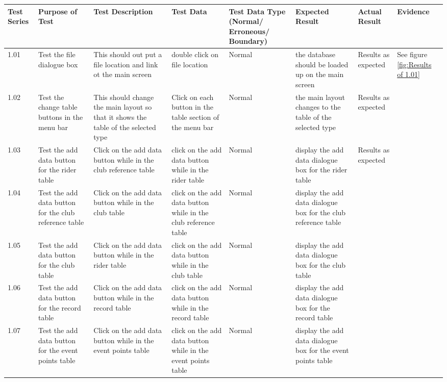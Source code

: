 \begin{landscape}
\begin{center}
    \begin{longtable}{|p{1.5cm}|p{2.5cm}|p{2.5cm}|p{2cm}|p{2cm}|p{2cm}|p{2cm}|p{2cm}|}
        \hline
        \textbf{Test Series} & \textbf{Purpose of Test} & \textbf{Test Description} & \textbf{Test Data} & \textbf{Test Data Type (Normal/ Erroneous/ Boundary)} & \textbf{Expected Result} & \textbf{Actual Result} & \textbf{Evidence}\\ \hline
        1.01 & Test the file dialogue box & This should out put a file location and link ot the main screen & double click on file location & Normal & the database should be loaded up on the main screen & Results as expected & See figure  \ref{fig:Results of 1.01} \\ \hline
        1.02 & Test the change table buttons in the menu bar  & This should change the main layout so that it shows the table of the selected type & Click on each button in the table section of the menu bar & Normal & the main layout changes to the table of the selected type & Results as expected & \\ \hline
        1.03 & Test the add data button for the rider table & Click on the add data button while in the club reference table & click on the add data button while in the rider table & Normal & display the add data dialogue box for the rider table & Results as expected & \\ \hline
        1.04 & Test the add data button for the club reference table & Click on the add data button while in the club table & click on the add data button while in the club reference table & Normal & display the add data dialogue box for the club reference table & & \\ \hline
        1.05 & Test the add data button for the club  table & Click on the add data button while in the rider table & click on the add data button while in the club table & Normal & display the add data dialogue box for the club  table & & \\ \hline
        \rowcolor{DarkGray}1.06 & Test the add data button for the record  table & Click on the add data button while in the record table & click on the add data button while in the record table & Normal & display the add data dialogue box for the record  table & & \\ \hline
        \rowcolor{DarkGray}1.07 & Test the add data button for the event points  table & Click on the add data button while in the event points table & click on the add data button while in the event points table & Normal & display the add data dialogue box for the event points  table & & \\ \hline

\end{longtable}
\end{center}
\end{landscape}
